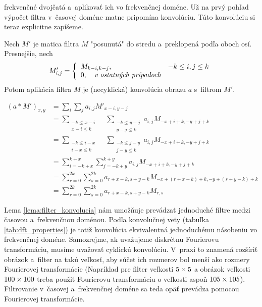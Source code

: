 frekvenčné dvojčatá a~aplikovať ich vo frekvenčnej doméne.
Už na prvý pohľad výpočet filtra v~časovej doméne matne pripomína
konvolúciu. Túto konvolúciu si teraz explicitne zapíšeme.
\begin{lema}
    Nech $M'$ je matica filtra $M$ "posunutá" do stredu a~preklopená
    podľa oboch osí. Presnejšie, nech 
    \begin{equation*}
        M'_{i,j} = \left\{
            \begin{array}{l l}
               M_{k-i,k-j}, \quad &  -k \le i,j \le k \\
               0, \quad \textit{v ostatných prípadoch}
            \end{array}
            \right.
    \end{equation*}
    Potom aplikácia filtra $M$ je (necyklická) konvolúcia obrazu
    $a$ s~filtrom $M'$.
    \label{lema:filter_konvolucia}
\end{lema}
\begin{dokaz}
    \begin{equation*}
    \begin{split}
        (a * M')_{x,y} &= \sum_i \sum_j a_{i,j} M'_{x-i,y-j} \\
        &= \sum_{\substack{-k\le x-i\\ x-i\le k}}\quad
           \sum_{\substack{-k\le y-j\\y-j\le k}}
           a_{i,j} M_{-x+i+k, -y+j+k} \\
        &= \sum_{\substack{-k\le i-x\\i-x\le k}}\quad
           \sum_{\substack{-k\le j-y\\j-y\le k}}
           a_{i,j} M_{-x+i+k, -y+j+k} \\
        &= \sum_{i=-k+x}^{k+x}
           \sum_{j=-k+y}^{k+y}
           a_{i,j} M_{-x+i+k, -y+j+k} \\
        &= \sum_{r=0}^{2k}
           \sum_{s=0}^{2k}
           a_{r+x-k,s+y-k} M_{-x+(r+x-k)+k, -y+(s+y-k)+k} \\
        &= \sum_{r=0}^{2k}
           \sum_{s=0}^{2k}
           a_{r+x-k,s+y-k} M_{r,s}
    \end{split}
    \end{equation*}
\end{dokaz}
Lema \ref{lema:filter_konvolucia} nám umožňuje prevádzať jednoduché
filtre medzi časovou a~frekvenčnou doménou. Podľa konvolučnej vety
(tabuľka \ref{tab:dft_properties}) je
totiž konvolúcia ekvivalentná jednoduchému násobeniu vo frekvenčnej
doméne. Samozrejme, ak uvažujeme diskrétnu Fourierovu transformáciu,
musíme uvažovať cyklickú konvolúciu. V~praxi to znamená rozšíriť
obrázok a~filter na takú veľkosť, aby súčet ich rozmerov bol menší ako
rozmery Fourierovej transformácie (Napríklad pre filter veľkosti
$5\times5$ a obrázok veľkosti $100\times100$ treba použiť Fourierovu
transformáciu o veľkosti aspoň $105\times105$).
Filtrovanie v~časovej
a~frekvenčnej doméne sa teda opäť prevádza pomocou Fourierovej
transformácie.

